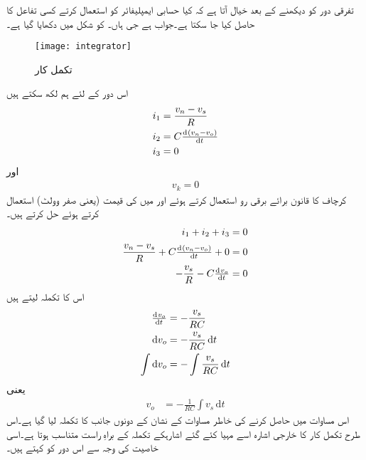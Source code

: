 تفرقی دور کو دیکھنے کے بعد خیال آتا ہے کہ کیا حسابی ایمپلیفائر کو استعمال کرتے کسی تفاعل کا  حاصل کیا جا سکتا ہے۔جواب ہے جی ہاں۔  کو شکل   میں دکھایا گیا ہے۔
\begin{figure}
\centering
\texttt{[image: integrator]}
\caption{تکمل کار}
\label{شکل_تکمل_کار}
\end{figure}
اس دور کے لئے ہم لکھ سکتے ہیں
\begin{gather}
\begin{aligned}
i_1 & = \frac{v_n-v_s}{R} \\
i_2 &= C \od{ (v_n-v_o )}{t} \\
i_3&=0
\end{aligned}
\end{gather}
اور
\begin{align}
v_k =0
\end{align}
کرچاف کا قانون برائے برقی رو استعمال کرتے ہوئے اور   میں  کی قیمت (یعنی صفر وولٹ) استعمال کرتے ہوئے حل کرتے ہیں۔
\begin{align*}
i_1+i_2+i_3&=0  \\
\frac{v_n-v_s}{R}+C \od{(v_n-v_o)}{t}+0&=0\\
-\frac{v_s}{R}-C\od{v_o}{t}&=0
\end{align*}
اس کا تکملہ لیتے ہیں
\begin{align*}
\od{v_o}{t}&=-\frac{v_s}{RC}\\
\mathrm{d}v_o&=-\frac{v_s}{RC} \, \mathrm{d}t\\
\int {\mathrm{d}v_o} & =-\int \frac{v_s}{RC} \, \mathrm{d}t
\end{align*}
یعنی
\begin{align} \label{مساوات_حسابی_تکمل_کار}
v_o&=-\frac{1}{RC} \int v_s \, \mathrm{d}t 
\end{align}
اس مساوات میں  حاصل کرنے کی خاطر مساوات کے نشان کے دونوں جانب کا تکملہ لیا گیا ہے۔اس طرح تکمل کار کا خارجی اشارہ   اسے مہیا کئے گئے اشارہکے تکملہ کے براہِ راست متناسب ہوتا ہے۔اسی خاصیت کی وجہ سے اس دور کو   کہتے ہیں۔

